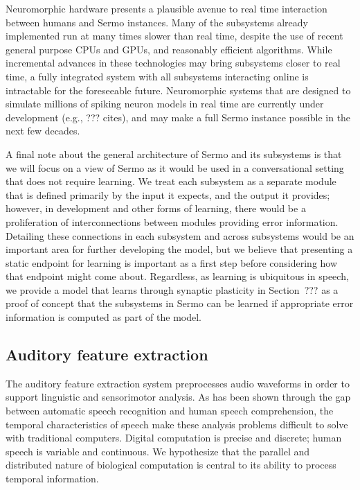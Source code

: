 Neuromorphic hardware
presents a plausible avenue
to real time interaction
between humans and Sermo instances.
Many of the subsystems already implemented
run at many times slower than real time,
despite the use of recent general purpose
CPUs and GPUs,
and reasonably efficient algorithms.
While incremental advances
in these technologies may
bring subsystems closer to real time,
a fully integrated system
with all subsystems interacting online
is intractable for the foreseeable future.
Neuromorphic systems that are designed
to simulate millions of spiking neuron models
in real time
are currently under development
(e.g., ??? cites),
and may make a full Sermo instance
possible in the next few decades.

A final note about
the general architecture of Sermo
and its subsystems
is that we will focus on a view
of Sermo as it would be used
in a conversational setting
that does not require learning.
We treat each subsystem as a separate
module that is defined primarily
by the input it expects,
and the output it provides;
however, in development and other forms
of learning,
there would be a proliferation of
interconnections between modules
providing error information.
Detailing these connections
in each subsystem and across subsystems
would be an important area
for further developing the model,
but we believe that presenting
a static endpoint for learning
is important as a first step
before considering
how that endpoint might come about.
Regardless,
as learning is ubiquitous in speech,
we provide a model that learns
through synaptic plasticity
in Section~??? as
a proof of concept that
the subsystems in Sermo
can be learned if appropriate
error information is computed
as part of the model.

\subsection{Auditory feature extraction}


The auditory feature extraction system
preprocesses audio waveforms
in order to support
linguistic and sensorimotor analysis.
As has been shown through
the gap between
automatic speech recognition
and human speech comprehension,
the temporal characteristics
of speech
make these analysis problems
difficult to solve
with traditional computers.
Digital computation is precise and discrete;
human speech is variable and continuous.
We hypothesize that the
parallel and distributed nature
of biological computation
is central to its
ability to process temporal information.

